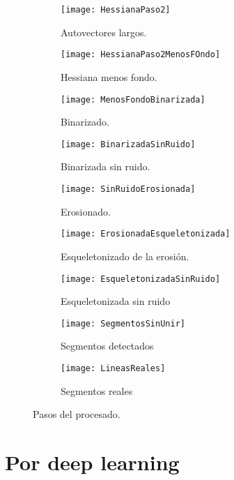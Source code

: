 \begin{figure}
	\begin{subfigure}[c]{.5\linewidth}
	\centering\large \texttt{[image: HessianaPaso2]}
	\caption{Autovectores largos.}
	\end{subfigure}%
	\begin{subfigure}[c]{.5\linewidth}
	\centering\large \texttt{[image: HessianaPaso2MenosFOndo]}
	\caption{Hessiana menos fondo.}
	\end{subfigure}%

	\begin{subfigure}[c]{.5\linewidth}
	\centering\large \texttt{[image: MenosFondoBinarizada]}
	\caption{Binarizado.}
	\end{subfigure}%
	\begin{subfigure}[c]{.5\linewidth}
	\centering\large \texttt{[image: BinarizadaSinRuido]}
	\caption{Binarizada sin ruido.}
	\end{subfigure}%

	\begin{subfigure}[c]{.5\linewidth}
	\centering\large \texttt{[image: SinRuidoErosionada]}
	\caption{Erosionado.}
	\end{subfigure}%
	\begin{subfigure}[c]{.5\linewidth}
	\centering\large \texttt{[image: ErosionadaEsqueletonizada]}
	\caption{Esqueletonizado de la erosión.}
	\end{subfigure}%
		
	\begin{subfigure}{.5\linewidth}
	\centering\large \texttt{[image: EsqueletonizadaSinRuido]}
	\caption{Esqueletonizada sin ruido}
	\end{subfigure}%
	\begin{subfigure}{.5\linewidth}
	\centering\large \texttt{[image: SegmentosSinUnir]}
	\caption{Segmentos detectados}
	\end{subfigure}%
	
	\begin{subfigure}{.5\linewidth}
	\centering\large \texttt{[image: LineasReales]}
	\caption{Segmentos reales}
	\end{subfigure}%
	

\caption{Pasos del procesado.}\label{fig:2.2}
\end{figure}







\section{Por deep learning}
